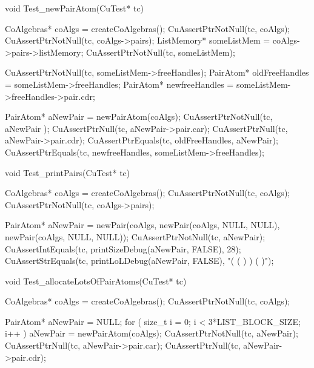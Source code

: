 void Test_newPairAtom(CuTest* tc) {
  CoAlgebras* coAlgs = createCoAlgebras();
  CuAssertPtrNotNull(tc, coAlgs);
  CuAssertPtrNotNull(tc, coAlgs->pairs);
  ListMemory* someListMem = coAlgs->pairs->listMemory;
  CuAssertPtrNotNull(tc, someListMem);

  CuAssertPtrNotNull(tc, someListMem->freeHandles);
  PairAtom* oldFreeHandles = someListMem->freeHandles;
  PairAtom* newfreeHandles = someListMem->freeHandles->pair.cdr;

  PairAtom* aNewPair = newPairAtom(coAlgs);
  CuAssertPtrNotNull(tc, aNewPair );
  CuAssertPtrNull(tc, aNewPair->pair.car);
  CuAssertPtrNull(tc, aNewPair->pair.cdr);
  CuAssertPtrEquals(tc, oldFreeHandles, aNewPair);
  CuAssertPtrEquals(tc, newfreeHandles, someListMem->freeHandles);
}

void Test_printPairs(CuTest* tc) {
  CoAlgebras* coAlgs = createCoAlgebras();
  CuAssertPtrNotNull(tc, coAlgs);
  CuAssertPtrNotNull(tc, coAlgs->pairs);

  PairAtom* aNewPair = newPair(coAlgs,
                               newPair(coAlgs, NULL, NULL),
                               newPair(coAlgs, NULL, NULL));
  CuAssertPtrNotNull(tc, aNewPair);
  CuAssertIntEquals(tc, printSizeDebug(aNewPair, FALSE), 28);
  CuAssertStrEquals(tc, printLoLDebug(aNewPair, FALSE), "( ( ) ) ( )");
}

void Test_allocateLotsOfPairAtoms(CuTest* tc) {
  CoAlgebras* coAlgs = createCoAlgebras();
  CuAssertPtrNotNull(tc, coAlgs);

  PairAtom* aNewPair = NULL;
  for ( size_t i = 0; i < 3*LIST_BLOCK_SIZE; i++ ) {
    aNewPair = newPairAtom(coAlgs);
  }
  CuAssertPtrNotNull(tc, aNewPair);
  CuAssertPtrNull(tc, aNewPair->pair.car);
  CuAssertPtrNull(tc, aNewPair->pair.cdr);
}
\stoptyping
